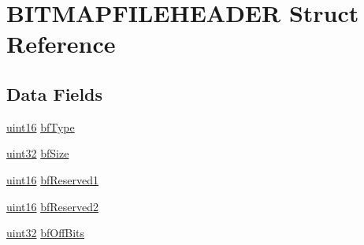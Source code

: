 \hypertarget{structBITMAPFILEHEADER}{\section{B\+I\+T\+M\+A\+P\+F\+I\+L\+E\+H\+E\+A\+D\+E\+R Struct Reference}
\label{structBITMAPFILEHEADER}
}
\subsection*{Data Fields}
\begin{DoxyCompactItemize}
\item 
\hyperlink{image__format_8c_afc4adc9111e54b3163b6126ce951ecc3}{uint16} \hyperlink{structBITMAPFILEHEADER_a37ad25a2c6577794f1e5376b45d5a7de}{bf\+Type}
\item 
\hyperlink{image__format_8c_a9695cf1104606879c5d3f0221635a069}{uint32} \hyperlink{structBITMAPFILEHEADER_a5b7969496b8a8a477ce2f9f6a602c556}{bf\+Size}
\item 
\hyperlink{image__format_8c_afc4adc9111e54b3163b6126ce951ecc3}{uint16} \hyperlink{structBITMAPFILEHEADER_ac01d6a25f6fde8d2427bbee61e03b9ab}{bf\+Reserved1}
\item 
\hyperlink{image__format_8c_afc4adc9111e54b3163b6126ce951ecc3}{uint16} \hyperlink{structBITMAPFILEHEADER_a5e2a8f1c1a537c5570dfdb8d875edc90}{bf\+Reserved2}
\item 
\hyperlink{image__format_8c_a9695cf1104606879c5d3f0221635a069}{uint32} \hyperlink{structBITMAPFILEHEADER_a7426a16a6cb6a65bd22b3696376d18dc}{bf\+Off\+Bits}
\end{DoxyCompactItemize}


